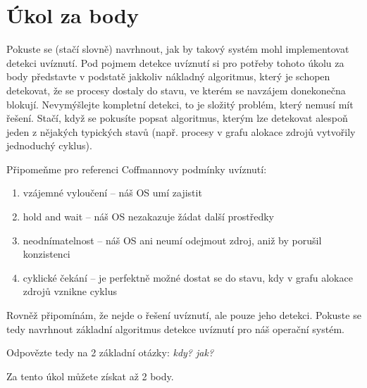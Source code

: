 \documentclass{article}
\begin{document}
\section{Úkol za body}

Pokuste se (stačí slovně) navrhnout, jak by takový systém mohl implementovat detekci uvíznutí. Pod pojmem detekce uvíznutí si pro potřeby tohoto úkolu za body představte v podstatě jakkoliv nákladný algoritmus, který je schopen detekovat, že se procesy dostaly do stavu, ve kterém se navzájem donekonečna blokují. Nevymýšlejte kompletní detekci, to je složitý problém, který nemusí mít řešení. Stačí, když se pokusíte popsat algoritmus, kterým lze detekovat alespoň jeden z nějakých typických stavů (např. procesy v grafu alokace zdrojů vytvořily jednoduchý cyklus).

Připomeňme pro referenci Coffmannovy podmínky uvíznutí:
\begin{enumerate}
	\item vzájemné vyloučení -- náš OS umí zajistit
	\item hold and wait -- náš OS nezakazuje žádat další prostředky
	\item neodnímatelnost -- náš OS ani neumí odejmout zdroj, aniž by porušil konzistenci
	\item cyklické čekání -- je perfektně možné dostat se do stavu, kdy v grafu alokace zdrojů vznikne cyklus
\end{enumerate}

Rovněž připomínám, že nejde o řešení uvíznutí, ale pouze jeho detekci. Pokuste se tedy navrhnout základní algoritmus detekce uvíznutí pro náš operační systém.

Odpovězte tedy na 2 základní otázky: \emph{kdy? jak?}

Za tento úkol můžete získat až 2 body.
\end{document}
